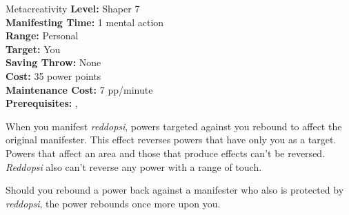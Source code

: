 {Metacreativity}
{
	\textbf{Level:}
	Shaper 7\\
	\textbf{Manifesting Time:}
	1 mental action\\
	\textbf{Range:}
	Personal\\
	\textbf{Target:}
	You\\
	\textbf{Saving Throw:}
	None\\
	\textbf{Cost:}
	35 power points\\
	\textbf{Maintenance Cost:}
	7 pp/minute\\
	\textbf{Prerequisites:}
	, \\
}
{
	When you manifest \emph{reddopsi}, powers targeted against you rebound to affect the original manifester. This effect reverses powers that have only you as a target. Powers that affect an area and those that produce effects can't be reversed. \emph{Reddopsi} also can't reverse any power with a range of touch.

	Should you rebound a power back against a manifester who also is protected by \emph{reddopsi}, the power rebounds once more upon you.
}